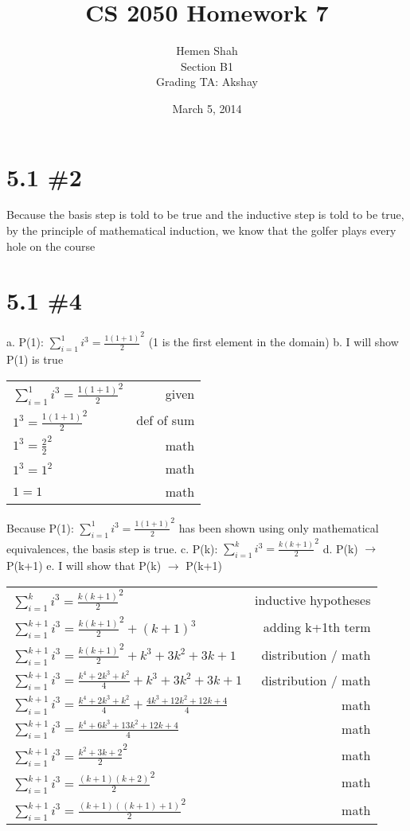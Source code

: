 \documentclass[h]{article}
\title{CS 2050 Homework 7}
\date{March 5, 2014}
\author{Hemen Shah \\ Section B1 \\ Grading TA: Akshay}
\begin{document}
\maketitle

\section*{5.1 \#2}
Because the basis step is told to be true and the inductive step is told to be true, by the principle of mathematical induction, we know that the golfer plays every hole on the course

\section*{5.1 \#4}
a. P(1): $\sum\limits_{i=1}^{1} i^3 = \frac{1(1+1)}{2}^2$ (1 is the first element in the domain)
\newline
b. I will show P(1) is true\newline
\begin{tabular}{l|r}
$\sum\limits_{i=1}^{1} i^3 = \frac{1(1+1)}{2}^2$ & given\\
$1^3 = \frac{1(1+1)}{2}^2$ & def of sum\\
$1^3 = \frac{2}{2}^2$ & math\\
$1^3 = 1^2$ & math\\
$1 = 1$ & math\\
\end{tabular}\newline
Because P(1): $\sum\limits_{i=1}^{1} i^3 = \frac{1(1+1)}{2}^2$ has been shown using only mathematical equivalences, the basis step is true.\newline
c. P(k): $\sum\limits_{i=1}^{k} i^3 = \frac{k(k+1)}{2}^2$\newline
d. P(k) $\rightarrow$ P(k+1)\newline
e. I will show that P(k) $\rightarrow$ P(k+1)\newline
\begin{tabular}{l|r}
$\sum\limits_{i=1}^{k} i^3 = \frac{k(k+1)}{2}^2$ & inductive hypotheses\\
$\sum\limits_{i=1}^{k+1} i^3 = \frac{k(k+1)}{2}^2 + (k+1)^3$ & adding k+1th term\\
$\sum\limits_{i=1}^{k+1} i^3 = \frac{k(k+1)}{2}^2 + k^3 + 3k^2 + 3k + 1$ & distribution / math\\
$\sum\limits_{i=1}^{k+1} i^3 = \frac{k^4 + 2k^3 + k^2}{4} + k^3 + 3k^2 + 3k + 1$ & distribution / math\\
$\sum\limits_{i=1}^{k+1} i^3 = \frac{k^4 + 2k^3 + k^2}{4} + \frac{4k^3 + 12k^2 + 12k + 4}{4}$ & math\\
$\sum\limits_{i=1}^{k+1} i^3 = \frac{k^4 + 6k^3 + 13k^2 + 12k + 4}{4}$ & math\\
$\sum\limits_{i=1}^{k+1} i^3 = \frac{k^2 + 3k + 2}{2}^2$ & math\\
$\sum\limits_{i=1}^{k+1} i^3 = \frac{(k + 1)(k + 2)}{2}^2$ & math\\
$\sum\limits_{i=1}^{k+1} i^3 = \frac{(k + 1)((k + 1) + 1)}{2}^2$ & math\\
\end{tabular}\newline
\end{document}
